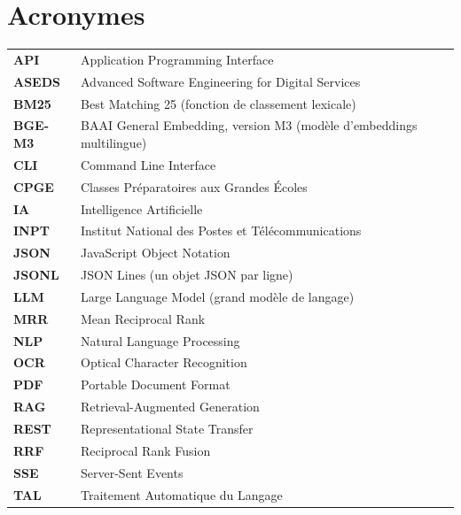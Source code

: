 \chapter{Acronymes}

\begin{tabular}{l l}

\textbf{API} & Application Programming Interface \\
\textbf{ASEDS} & Advanced Software Engineering for Digital Services \\
\textbf{BM25} & Best Matching 25 (fonction de classement lexicale) \\
\textbf{BGE-M3} & BAAI General Embedding, version M3 (modèle d'embeddings multilingue) \\
\textbf{CLI} & Command Line Interface \\
\textbf{CPGE} & Classes Préparatoires aux Grandes Écoles \\
\textbf{IA} & Intelligence Artificielle \\
\textbf{INPT} & Institut National des Postes et Télécommunications \\
\textbf{JSON} & JavaScript Object Notation \\
\textbf{JSONL} & JSON Lines (un objet JSON par ligne) \\
\textbf{LLM} & Large Language Model (grand modèle de langage) \\
\textbf{MRR} & Mean Reciprocal Rank \\
\textbf{NLP} & Natural Language Processing \\
\textbf{OCR} & Optical Character Recognition \\
\textbf{PDF} & Portable Document Format \\
\textbf{RAG} & Retrieval-Augmented Generation \\
\textbf{REST} & Representational State Transfer \\
\textbf{RRF} & Reciprocal Rank Fusion \\
\textbf{SSE} & Server-Sent Events \\
\textbf{TAL} & Traitement Automatique du Langage \\

\end{tabular}
